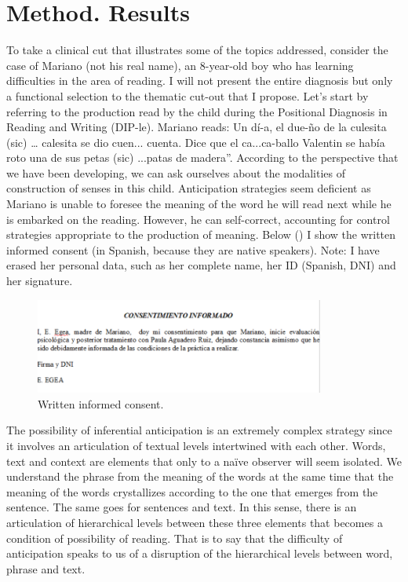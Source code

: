 \documentclass[english]{textolivre}
\begin{document}
\begin{enumerate}[label=\alph*.]
\end{enumerate}

\section{Method. Results}\label{sec-modelo}
To take a clinical cut that illustrates some of the topics addressed, consider the case of Mariano (not his real name), an 8-year-old boy who has learning difficulties in the area of reading. I will not present the entire diagnosis but only a functional selection to the thematic cut-out that I propose. Let's start by referring to the production read by the child during the Positional Diagnosis in Reading and Writing (DIP-le). Mariano reads: Un dí-a, el due-ño de la culesita (sic) … calesita se dio cuen... cuenta. Dice que el ca...ca-ballo Valentin se había roto una de sus petas (sic) ...patas de madera”. According to the perspective that we have been developing, we can ask ourselves about the modalities of construction of senses in this child. Anticipation strategies seem deficient as Mariano is unable to foresee the meaning of the word he will read next while he is embarked on the reading. However, he can self-correct, accounting for control strategies appropriate to the production of meaning. Below () I show the written informed consent (in Spanish, because they are native speakers). Note: I have erased her personal data, such as her complete name, her ID (Spanish, DNI) and her signature.

\begin{figure}[htbp]
 \centering
 \includegraphics[width=0.85\textwidth]{Fig1.png}
 \caption{Written informed consent.}
 \label{fig01}
\end{figure}

The possibility of inferential anticipation is an extremely complex strategy since it involves an articulation of textual levels intertwined with each other. Words, text and context are elements that only to a naïve observer will seem isolated. We understand the phrase from the meaning of the words at the same time that the meaning of the words crystallizes according to the one that emerges from the sentence. The same goes for sentences and text. In this sense, there is an articulation of hierarchical levels between these three elements that becomes a condition of possibility of reading. That is to say that the difficulty of anticipation speaks to us of a disruption of the hierarchical levels between word, phrase and text.
\end{document}
